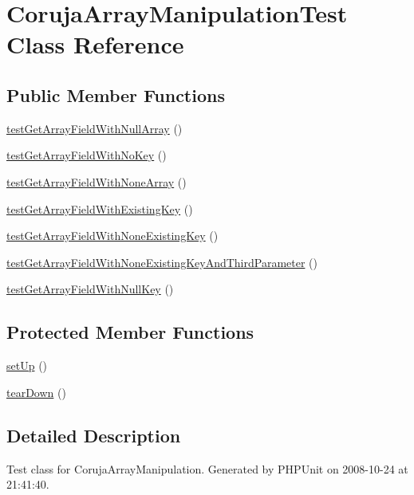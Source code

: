 \hypertarget{class_coruja_array_manipulation_test}{
\section{CorujaArrayManipulationTest Class Reference}
\label{class_coruja_array_manipulation_test}
}
\subsection*{Public Member Functions}
\begin{CompactItemize}
\item 
\hyperlink{class_coruja_array_manipulation_test_dabd8c0d53cf5be851dc7bc2d9e32b24}{testGetArrayFieldWithNullArray} ()
\item 
\hyperlink{class_coruja_array_manipulation_test_2ce7f6b702b5c5759caa833553685277}{testGetArrayFieldWithNoKey} ()
\item 
\hyperlink{class_coruja_array_manipulation_test_0ea85caeb9df2acc96a2925cccf66657}{testGetArrayFieldWithNoneArray} ()
\item 
\hyperlink{class_coruja_array_manipulation_test_70afd0de3dbdbff588407119c96eaeaf}{testGetArrayFieldWithExistingKey} ()
\item 
\hyperlink{class_coruja_array_manipulation_test_0c2a0c4697a44a9bed5f743949b7ec3e}{testGetArrayFieldWithNoneExistingKey} ()
\item 
\hyperlink{class_coruja_array_manipulation_test_1b71ccbdf79e11fbaed4fd93b3d97ee6}{testGetArrayFieldWithNoneExistingKeyAndThirdParameter} ()
\item 
\hyperlink{class_coruja_array_manipulation_test_8816ce6795b708ba877c5fe5e141ace5}{testGetArrayFieldWithNullKey} ()
\end{CompactItemize}
\subsection*{Protected Member Functions}
\begin{CompactItemize}
\item 
\hyperlink{class_coruja_array_manipulation_test_3296e5ecf614e4ef4d8a3fd91a226ac1}{setUp} ()
\item 
\hyperlink{class_coruja_array_manipulation_test_d15e32490c9bf3ad9a5b940792e7a781}{tearDown} ()
\end{CompactItemize}


\subsection{Detailed Description}
Test class for CorujaArrayManipulation. Generated by PHPUnit on 2008-10-24 at 21:41:40. 

